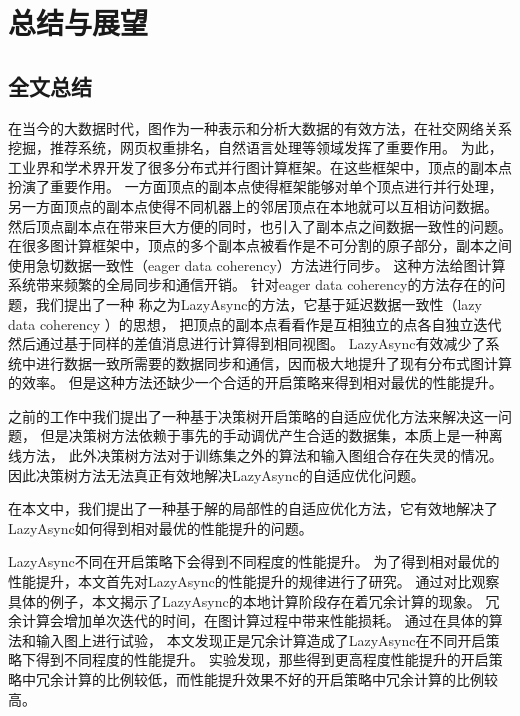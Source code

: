 
\chapter{总结与展望}

\section{全文总结}

在当今的大数据时代，图作为一种表示和分析大数据的有效方法，在社交网络关系挖掘，推荐系统，网页权重排名，自然语言处理等领域发挥了重要作用。
为此，工业界和学术界开发了很多分布式并行图计算框架。在这些框架中，顶点的副本点扮演了重要作用。
一方面顶点的副本点使得框架能够对单个顶点进行并行处理，另一方面顶点的副本点使得不同机器上的邻居顶点在本地就可以互相访问数据。
然后顶点副本点在带来巨大方便的同时，也引入了副本点之间数据一致性的问题。
在很多图计算框架中，顶点的多个副本点被看作是不可分割的原子部分，副本之间使用急切数据一致性（eager data coherency）方法进行同步。
这种方法给图计算系统带来频繁的全局同步和通信开销。
针对eager data coherency的方法存在的问题，我们提出了一种
称之为LazyAsync的方法，它基于延迟数据一致性（lazy data coherency ）的思想，
把顶点的副本点看看作是互相独立的点各自独立迭代然后通过基于同样的差值消息进行计算得到相同视图。
LazyAsync有效减少了系统中进行数据一致所需要的数据同步和通信，因而极大地提升了现有分布式图计算的效率。
但是这种方法还缺少一个合适的开启策略来得到相对最优的性能提升。

之前的工作中我们提出了一种基于决策树开启策略的自适应优化方法来解决这一问题，
但是决策树方法依赖于事先的手动调优产生合适的数据集，本质上是一种离线方法，
此外决策树方法对于训练集之外的算法和输入图组合存在失灵的情况。
因此决策树方法无法真正有效地解决LazyAsync的自适应优化问题。

在本文中，我们提出了一种基于解的局部性的自适应优化方法，它有效地解决了LazyAsync如何得到相对最优的性能提升的问题。


LazyAsync不同在开启策略下会得到不同程度的性能提升。
为了得到相对最优的性能提升，本文首先对LazyAsync的性能提升的规律进行了研究。
通过对比观察具体的例子，本文揭示了LazyAsync的本地计算阶段存在着冗余计算的现象。
冗余计算会增加单次迭代的时间，在图计算过程中带来性能损耗。
通过在具体的算法和输入图上进行试验，
本文发现正是冗余计算造成了LazyAsync在不同开启策略下得到不同程度的性能提升。
实验发现，那些得到更高程度性能提升的开启策略中冗余计算的比例较低，而性能提升效果不好的开启策略中冗余计算的比例较高。

